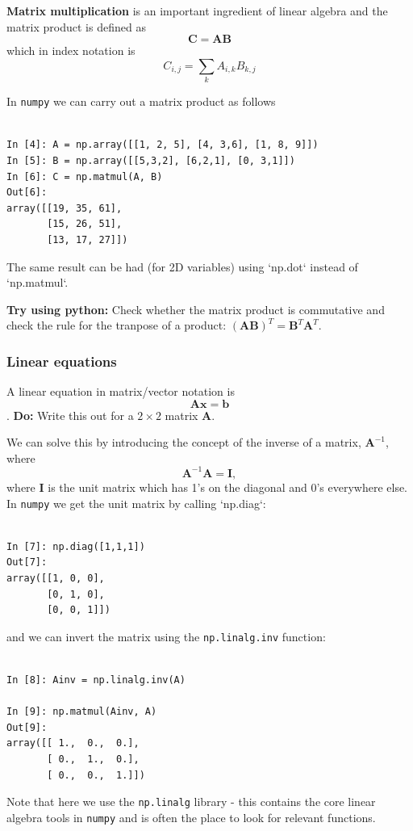 \documentclass[a4paper,10pt]{article}
\begin{document}
\textbf{Matrix multiplication} is an important ingredient of linear algebra and the matrix product is defined as
$$\mathbf{C} = \mathbf{A}\mathbf{B}$$
which in index notation is
$$C_{i,j} = \sum_k A_{i,k} B_{k, j}$$

In \texttt{numpy} we can carry out a matrix product as follows
\begin{lstlisting}

In [4]: A = np.array([[1, 2, 5], [4, 3,6], [1, 8, 9]])
In [5]: B = np.array([[5,3,2], [6,2,1], [0, 3,1]])
In [6]: C = np.matmul(A, B)
Out[6]: 
array([[19, 35, 61],
       [15, 26, 51],
       [13, 17, 27]])
\end{lstlisting}

The same result can be had (for 2D variables) using `np.dot` instead of `np.matmul`.

\textbf{Try using python:} Check whether the matrix product is commutative and check the rule for the tranpose of a product:
$(\mathbf{A}\mathbf{B})^T = \mathbf{B}^T\mathbf{A}^T$.


\subsubsection{ Linear equations}

A linear equation in matrix/vector notation is
$$\mathbf{A}\mathbf{x} = \mathbf{b}$$.
\textbf{Do:} Write this out for a $2\times 2$ matrix $\mathbf{A}$.

We can solve this by introducing the concept of the inverse of a matrix, $\mathbf{A}^{-1}$, where
$$\mathbf{A}^{-1} \mathbf{A} = \mathbf{I},$$ where $ \mathbf{I}$ is the unit matrix which has 1's on the diagonal and 0's everywhere else. In \texttt{numpy} we get the unit matrix by calling `np.diag`:
\begin{lstlisting}

In [7]: np.diag([1,1,1])
Out[7]: 
array([[1, 0, 0],
       [0, 1, 0],
       [0, 0, 1]])
\end{lstlisting}
and we can invert the matrix using the \texttt{np.linalg.inv} function:
\begin{lstlisting}

In [8]: Ainv = np.linalg.inv(A)

In [9]: np.matmul(Ainv, A)
Out[9]: 
array([[ 1.,  0.,  0.],
       [ 0.,  1.,  0.],
       [ 0.,  0.,  1.]])
\end{lstlisting}
Note that here we use the \texttt{np.linalg} library - this contains the core linear algebra tools in \texttt{numpy} and is often the place to look for relevant functions.
\end{document}
